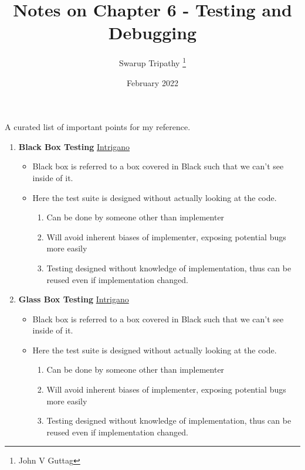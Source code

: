 \documentclass[11pt]{article}
\title{Notes on Chapter 6 - Testing and Debugging}
\author{Swarup Tripathy \thanks{John V Guttag}}
\date{February 2022}
\begin{document}
    \maketitle
    A curated list of important points for my reference.\\
    \begin{enumerate}
        \item \textbf{Black Box Testing} \href{https://www.youtube.com/watch?v=H7k3R1_A_yI}{Intrigano}
        \begin{itemize}
            \item Black box is referred to a box covered in Black such that we can't see inside of it.
            \item Here the test suite is designed without actually looking at the code.
            \begin{enumerate}
                \item Can be done by someone other than implementer
                \item Will avoid inherent biases of implementer, exposing potential bugs more easily
                \item Testing designed without knowledge of implementation, thus can be reused even if implementation changed.
            \end{enumerate}
        \end{itemize}
        \item \textbf{Glass Box Testing} \href{https://www.youtube.com/watch?v=cpJ5AjRl8gI}{Intrigano}
        \begin{itemize}
            \item Black box is referred to a box covered in Black such that we can't see inside of it.
            \item Here the test suite is designed without actually looking at the code.
            \begin{enumerate}
                \item Can be done by someone other than implementer
                \item Will avoid inherent biases of implementer, exposing potential bugs more easily
                \item Testing designed without knowledge of implementation, thus can be reused even if implementation changed.
            \end{enumerate}
        \end{itemize}
    \end{enumerate}
\end{document}
